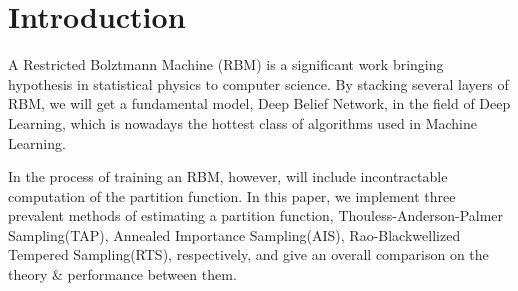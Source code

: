 


\section{Introduction} \label{sec:introduction}





A Restricted Bolztmann Machine (RBM)\cite{mcclelland1987parallel} is a significant work bringing hypothesis in statistical physics to computer science. By stacking several layers of RBM, we will get a fundamental model, Deep Belief Network\cite{hinton2006reducing}, in the field of Deep Learning, which is nowadays the hottest class of algorithms used in Machine Learning.

In the process of training an RBM, however, will include incontractable computation of the partition function.
In this paper, we implement three prevalent methods of estimating a partition function, Thouless-Anderson-Palmer Sampling(TAP)\cite{gabrie2015training}, Annealed Importance Sampling(AIS)\cite{neal2001annealed,salakhutdinov2009learning}, Rao-Blackwellized Tempered Sampling(RTS)\cite{carlson2016partition}, respectively, and give an overall comparison on the theory \& performance between them.




